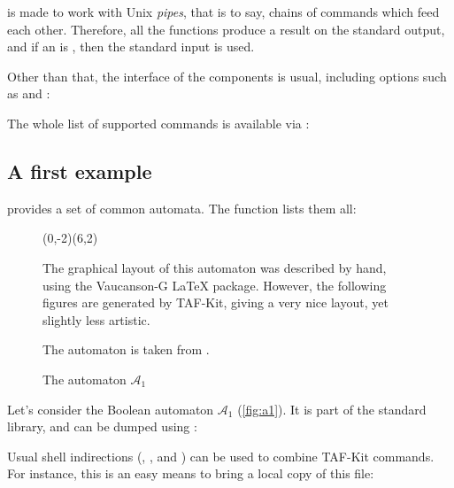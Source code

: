 \tafkit is made to work with Unix \emph{pipes}, that is to say, chains
of commands which feed each other.  Therefore, all the functions
produce a result on the standard output, and if an  is
\samp{-}, then the standard input is used.

Other than that, the interface of the \tafkit components is usual,
including options such as  and :


The whole list of supported commands is available via
:


\subsection{A first example}

\Vauc provides a set of common automata.  The function
 lists them all:


\begin{figure}[ht] \centering
  \begin{VCPicture}{(0,-2)(6,2)}
  \end{VCPicture}
  \begin{legend}
    The graphical layout of this automaton was described by hand,
    using the Vaucanson-G \LaTeX{} package.  However, the following
    figures are generated by TAF-Kit, giving a very nice layout, yet
    slightly less artistic.

    The automaton is taken from \citet[Fig. I.1.1, p. 58]{sakarovitch.03.eta}.
  \end{legend}
  \caption{The automaton $\mathcal{A}_1$}
  \label{fig:a1}
\end{figure}

Let's consider the Boolean automaton $\mathcal{A}_1$
(\autoref{fig:a1}).  It is part of the standard library, and
can be dumped using :


Usual shell indirections (\samp{|}, \samp{>}, and \samp{<}) can be
used to combine TAF-Kit commands.  For instance, this is an easy means
to bring a local copy of this file:

